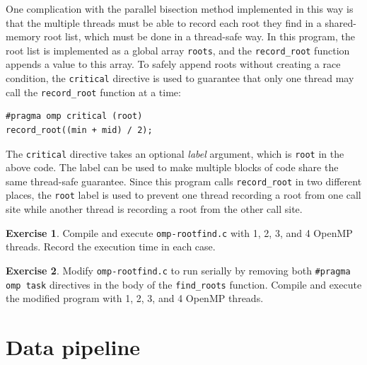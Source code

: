 \documentclass{article}
\theoremstyle{definition}
\newtheorem{exercise}{Exercise}
\begin{document}
One complication with the parallel bisection method implemented in this way is that the multiple threads must be able to record each root they find in a shared-memory root list, which must be done in a thread-safe way. In this program, the root list is implemented as a global array \texttt{roots}, and the \texttt{record\_root} function appends a value to this array. To safely append roots without creating a race condition, the \texttt{critical} directive is used to guarantee that only one thread may call the \texttt{record\_root} function at a time:

\begin{verbatim}
#pragma omp critical (root)
record_root((min + mid) / 2);
\end{verbatim}

The \texttt{critical} directive takes an optional \emph{label} argument, which is \texttt{root} in the above code. The label can be used to make multiple blocks of code share the same thread-safe guarantee. Since this program calls \texttt{record\_root} in two different places, the \texttt{root} label is used to prevent one thread recording a root from one call site while another thread is recording a root from the other call site.

\begin{exercise}
\label{ex:rootfind}
Compile and execute \texttt{omp-rootfind.c} with 1, 2, 3, and 4 OpenMP threads. Record the execution time in each case.
\end{exercise}

\begin{exercise}
\label{ex:rootfind-serial}
Modify \texttt{omp-rootfind.c} to run serially by removing both \texttt{\#pragma omp task} directives in the body of the \texttt{find\_roots} function. Compile and execute the modified program with 1, 2, 3, and 4 OpenMP threads. 
\end{exercise}


\section{Data pipeline}
\end{document}
